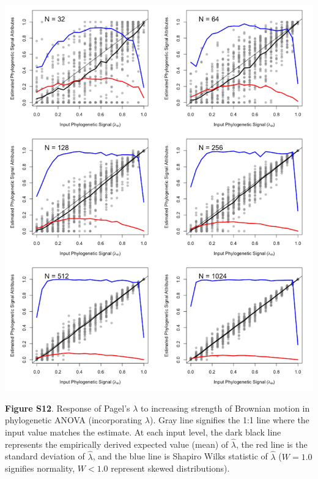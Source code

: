\documentclass[
]{article}
\begin{document}
\includegraphics[width=0.95\linewidth]{fig.S12}

\textbf{Figure S12}. Response of Pagel's \(\lambda\) to increasing
strength of Brownian motion in phylogenetic ANOVA (incorporating
\(\lambda\)). Gray line signifies the 1:1 line where the input value
matches the estimate. At each input level, the dark black line
represents the empirically derived expected value (mean) of
\(\hat\lambda\), the red line is the standard deviation of
\(\hat\lambda\), and the blue line is Shapiro Wilks statistic of
\(\hat\lambda\) (\(W=1.0\) signifies normality, \(W< 1.0\) represent
skewed distributions).
\end{document}
